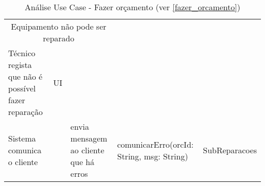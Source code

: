 \documentclass[../relatorio.tex]{subfiles}
\begin{document}
\begin{landscape}
\begin{table}[!h]
\begin{tabular}{|p{5cm}|p{1cm}|p{4cm}|p{6cm}|p{3cm}|}
            \multicolumn{3}{c}{Equipamento não pode ser reparado}
            \\
            \rowcolor{yellow}
            \hline
            Técnico regista que não é possível fazer reparação
                     & 
            UI
                     & 
                     & 
                     & 
            \\
            \hline
            Sistema comunica o cliente
                     & 
                     & 
            envia mensagem ao cliente que há erros
                     & 
            comunicarErro(orcId: String, msg: String)
                     & 
            SubReparacoes
            \\
            \hline
        \end{tabular}
        \caption{Análise Use Case - Fazer orçamento (ver \ref{fazer_orcamento})}
    \end{table}
\end{landscape}
\end{document}

